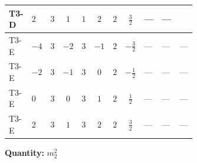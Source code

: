 \documentclass[8pt]{article}
\begin{document}
\begin{landscape}
\begin{longtable}{@{}llcccccc >{\raggedright\arraybackslash}p{0.21\linewidth} >{\raggedright\arraybackslash}p{0.21\linewidth} >{\raggedright\arraybackslash}p{0.21\linewidth}@{}}
\midrule
T3-D & $2$ & $3$ & $1$ & $1$ & $2$ & $2$ & $\frac{3}{2}$ & --- & --- & \scriptsize\adjustbox{max width=\linewidth}{$\begin{gathered} {m_2^2} (4 T_{\nu}^{(2)}+4 {\lambda_{S_2}^{(1)}})\end{gathered}$} \\
\midrule
T3-E & $-4$ & $3$ & $-2$ & $3$ & $-1$ & $2$ & $-\frac{3}{2}$ & --- & --- & --- \\
\midrule
T3-E & $-2$ & $3$ & $-1$ & $3$ & $0$ & $2$ & $-\frac{1}{2}$ & --- & --- & --- \\
\midrule
T3-E & $0$ & $3$ & $0$ & $3$ & $1$ & $2$ & $\frac{1}{2}$ & --- & --- & --- \\
\midrule
T3-E & $2$ & $3$ & $1$ & $3$ & $2$ & $2$ & $\frac{3}{2}$ & --- & --- & --- \\
\midrule
\bottomrule
\end{longtable}
\clearpage
\noindent\textbf{Quantity: }$m_2^2$\par\smallskip

\end{landscape}
\end{document}
